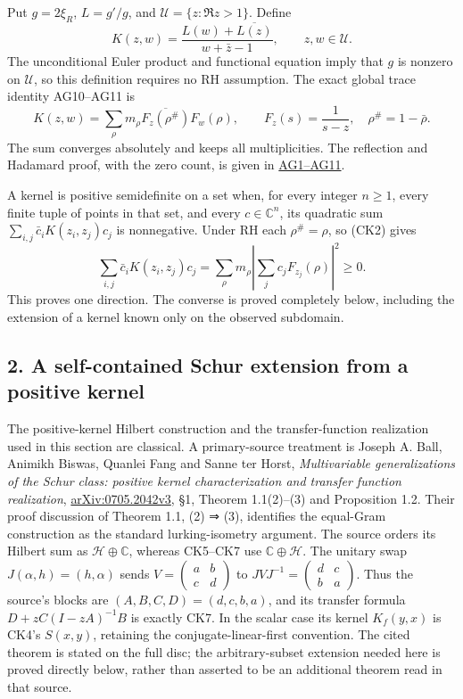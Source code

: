 \documentclass[
  10pt,
  a4paper,
]{article}
\begin{document}
Put \(g=2\xi_R\), \(L=g'/g\), and \(\mathcal U=\{z:\Re z>1\}\). Define
\[
K(z,w)=\frac{L(w)+\overline{L(z)}}{w+\bar z-1},\qquad z,w\in\mathcal U.
\tag{CK1}
\] The unconditional Euler product and functional equation imply that
\(g\) is nonzero on \(\mathcal U\), so this definition requires no RH
assumption. The exact global trace identity AG10--AG11 is \[
K(z,w)=\sum_\rho m_\rho
\overline{F_z(\rho^\#)}F_w(\rho),\qquad
F_z(s)=\frac1{s-z},\quad\rho^\#=1-\bar\rho.
\tag{CK2}
\] The sum converges absolutely and keeps all multiplicities. The
reflection and Hadamard proof, with the zero count, is given in
\href{ACTUAL_HEAT_ZERO_DISTRIBUTION_VARIATION.md}{AG1--AG11}.

A kernel is positive semidefinite on a set when, for every integer
\(n\ge1\), every finite tuple of points in that set, and every
\(c\in\mathbb C^n\), its quadratic sum
\(\sum_{i,j}\bar c_iK(z_i,z_j)c_j\) is nonnegative. Under RH each
\(\rho^\#=\rho\), so (CK2) gives \[
\sum_{i,j}\bar c_iK(z_i,z_j)c_j
=\sum_\rho m_\rho\left|\sum_j c_jF_{z_j}(\rho)\right|^2\ge0.
\tag{CK3}
\] This proves one direction. The converse is proved completely below,
including the extension of a kernel known only on the observed
subdomain.

\subsection{2. A self-contained Schur extension from a positive
kernel}\label{a-self-contained-schur-extension-from-a-positive-kernel}

The positive-kernel Hilbert construction and the transfer-function
realization used in this section are classical. A primary-source
treatment is Joseph A. Ball, Animikh Biswas, Quanlei Fang and Sanne ter
Horst, \emph{Multivariable generalizations of the Schur class: positive
kernel characterization and transfer function realization},
\href{https://arxiv.org/abs/0705.2042v3}{arXiv:0705.2042v3}, §1, Theorem
1.1(2)--(3) and Proposition 1.2. Their proof discussion of Theorem 1.1,
(2) ⇒ (3), identifies the equal-Gram construction as the standard
lurking-isometry argument. The source orders its Hilbert sum as
\(\mathcal H\oplus\mathbb C\), whereas CK5--CK7 use
\(\mathbb C\oplus\mathcal H\). The unitary swap
\(J(\alpha,h)=(h,\alpha)\) sends
\(V=\left(\begin{smallmatrix}a&b\\c&d\end{smallmatrix}\right)\) to
\(JVJ^{-1}=\left(\begin{smallmatrix}d&c\\b&a\end{smallmatrix}\right)\).
Thus the source's blocks are \((A,B,C,D)=(d,c,b,a)\), and its transfer
formula \(D+zC(I-zA)^{-1}B\) is exactly CK7. In the scalar case its
kernel \(K_f(y,x)\) is CK4's \(S(x,y)\), retaining the
conjugate-linear-first convention. The cited theorem is stated on the
full disc; the arbitrary-subset extension needed here is proved directly
below, rather than asserted to be an additional theorem read in that
source.
\end{document}
